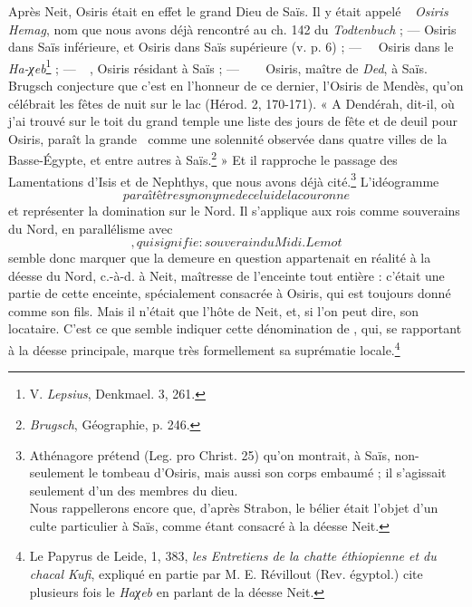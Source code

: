 \documentclass[a4paper, 11pt, oneside]{article}
\newcommand*\hieroAAAW{\raisebox{0.5ex}{}}
\newcommand*\hieroAAAX{}
\newcommand*\hieroAABC{\raisebox{0.5ex}{}}
\newcommand*\hieroAADV{\raisebox{0.5ex}{}}
\newcommand*\hieroAAEZ{}
\newcommand*\hieroAAFW{}
\newcommand*\hieroAAHK{}
\newcommand*\hieroAAHO{}
\newcommand*\hieroAAIL{}
\newcommand*\hieroAAIQ{}
\newcommand*\hieroAAJC{}
\newcommand*\hieroAAJE{}
\newcommand*\hieroAAJF{}
\newcommand*\hieroAAJG{}
\newcommand*\hieroAAJH{\raisebox{0.5ex}{}}
\newcommand*\hieroAAJI{}
\newcommand*\hieroAAJJ{}
\newcommand*\hieroAAJK{}
\newcommand*\hieroAAJL{}
\begin{document}
Après Neit, Osiris était en effet le grand Dieu de Saïs. Il y était appelé $\hieroAAJE\:\hieroAAEZ\:\hieroAAJF$ \emph{Osiris Hemag}, nom que nous avons déjà rencontré au ch. 142 du \emph{Todtenbuch} ; --- Osiris dans Saïs inférieure, et Osiris dans Saïs supérieure (v. p. 6) ; --- $\hieroAAJE\:\hieroAAHO\allowbreak\:\hieroAAHK\:\hieroAAJC$ Osiris dans le \emph{Ha-χeb}\footnote{V. \emph{Lepsius}, Denkmael. 3, 261.} ; --- $\hieroAAJG\:\hieroAAIQ\allowbreak\:\hieroAAJH\:\hieroAAAW$, Osiris résidant à Saïs ; --- $\hieroAAJG\:\hieroAABC\:\hieroAAJI\allowbreak\:\hieroAAJJ\:\hieroAADV\allowbreak\:\hieroAAJH\:\hieroAAAW$ Osiris, maître de \emph{Ded}, à Saïs. Brugsch conjecture que c'est en l'honneur de ce dernier, l'Osiris de Mendès, qu'on célébrait les fêtes de nuit sur le lac (Hérod. 2, 170-171). « A Dendérah, dit-il, où j'ai trouvé sur le toit du grand temple une liste des jours de fête et de deuil pour Osiris, paraît la grande $\hieroAAJK\:\hieroAAJL$ comme une solennité observée dans quatre villes de la Basse-Égypte, et entre autres à Saïs.\footnote{\emph{Brugsch}, Géographie, p. 246.} » Et il rapproche le passage des Lamentations d'Isis et de Nephthys, que nous avons déjà cité.\footnote{Athénagore prétend (Leg. pro Christ. 25) qu'on montrait, à Saïs, non-seulement le tombeau d'Osiris, mais aussi son corps embaumé ; il s'agissait seulement d'un des membres du dieu.\\\hspace*{5mm}Nous rappellerons encore que, d'après Strabon, le bélier était l'objet d'un culte particulier à Saïs, comme étant consacré à la déesse Neit.} L'idéogramme $\hieroAAJC$ paraît être synonyme de celui de la couronne $\hieroAAIL$ et représenter la domination sur le Nord. Il s'applique aux rois comme souverains du Nord, en parallélisme avec $\hieroAAAX$, qui signifie : souverain du Midi. Le mot $\hieroAAFW$ semble donc marquer que la demeure en question appartenait en réalité à la déesse du Nord, c.-à-d. à Neit, maîtresse de l'enceinte tout entière : c'était une partie de cette enceinte, spécialement consacrée à Osiris, qui est toujours donné comme son fils. Mais il n'était que l'hôte de Neit, et, si l'on peut dire, son locataire. C'est ce que semble indiquer cette dénomination de $\hieroAAFW$, qui, se rapportant à la déesse principale, marque très formellement sa suprématie locale.\footnote{Le Papyrus de Leide, 1, 383, \emph{les Entretiens de la chatte éthiopienne et du chacal Kufi}, expliqué en partie par M. E. Révillout (Rev. égyptol.) cite plusieurs fois le \emph{Haχeb} en parlant de la déesse Neit.}
\end{document}

